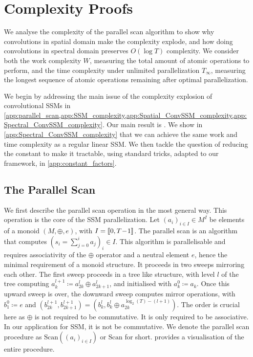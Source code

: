 \documentclass{article}
\begin{document}



\newpage
\appendix

\section{Complexity Proofs}
\label{app:complexity_proofs}

We analyse the complexity of the parallel scan algorithm to show why convolutions in spatial domain make the complexity explode, and how doing convolutions in spectral domain preserves $O(\log T)$ complexity. We consider both the work complexity $W$, measuring the total amount of atomic operations to perform, and the time complexity under unlimited parallelization $T_\infty$, measuring the longest sequence of atomic operations remaining after optimal parallelization.

We begin by addressing the main issue of the complexity explosion of convolutional SSMs in \cref{app:parallel_scan,app:SSM_complexity,app:Spatial_ConvSSM_complexity,app:Spectral_ConvSSM_complexity}. Our main result is . We show in \cref{app:Spectral_ConvSSM_complexity} that we can achieve the same work and time complexity as a regular linear SSM. We then tackle the question of reducing the constant to make it tractable, using standard tricks, adapted to our framework, in \cref{app:constant_factors}.

\subsection{The Parallel Scan}
\label{app:parallel_scan}

We first describe the parallel scan operation in the most general way. This operation is the core of the SSM parallelization. Let $(a_i)_{i\in I}\in M^I$ be elements of a monoid $(M,\oplus,e)$, with $I=\llbracket 0, T\!-\!1 \rrbracket$. The parallel scan is an algorithm that computes $(s_i=\sum_{j=0}^ia_j)_i\in I$. This algorithm is parallelisable and requires associativity of the $\oplus$ operator and a neutral element $e$, hence the minimal requirement of a monoid structure. It proceeds in two sweeps mirroring each other. The first sweep proceeds in a tree like structure, with level $l$ of the tree computing $a^{l+1}_{k}\coloneqq a^l_{2k} \oplus a^l_{2k+1}$, and initialised with $a^0_k\coloneqq a_k$. Once this upward sweep is over, the downward sweep computes mirror operations, with $b^0_1\coloneqq e$ and $(b^{l+1}_{2k}, b^{l+1}_{2k+1}) = (b^{l}_{k}, b^{l}_{k} \oplus a^{\log_2(T)-(l+1)}_{2k})$. The order is crucial here as $\oplus$ is not required to be commutative. It is only required to be associative. In our application for SSM, it is not be commutative. We denote the parallel scan procedure as $\mathrm{Scan}((a_i)_{i\in I})$ or $\mathrm{Scan}$ for short.
 provides a visualisation of the entire procedure.
\end{document}
